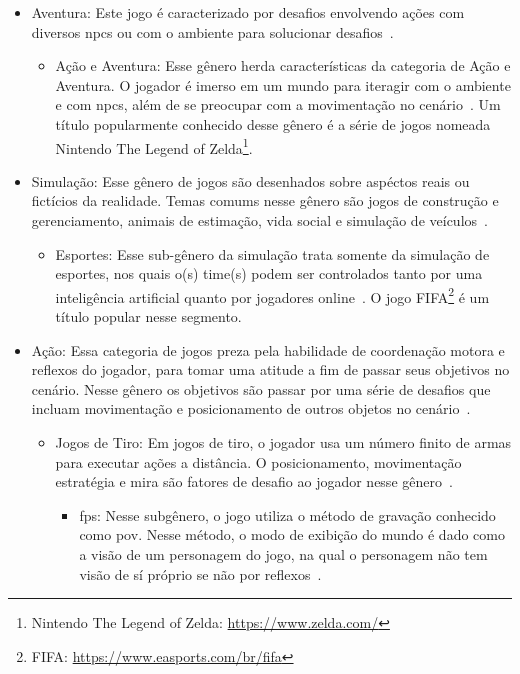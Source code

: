 \begin{itemize}
\begin{itemize}
    \end{itemize}
  \item Aventura: Este jogo é caracterizado por desafios envolvendo ações com diversos \ac{npcs} ou com o ambiente para solucionar desafios~\cite{adams_1208533}.
    \begin{itemize}
      \item Ação e Aventura: Esse gênero herda características da categoria de Ação e Aventura. O jogador é imerso em um mundo para iteragir com o ambiente e com \ac{npcs}, além de se preocupar com a movimentação no cenário~\cite{adams_1208533}. Um título popularmente conhecido desse gênero é a série de jogos nomeada Nintendo The Legend of Zelda\footnote{Nintendo The Legend of Zelda: \url{https://www.zelda.com/}}.
    \end{itemize}
  \item Simulação: Esse gênero de jogos são desenhados sobre aspéctos reais ou fictícios da realidade. Temas comums nesse gênero são jogos de construção e gerenciamento, animais de estimação, vida social e simulação de veículos~\cite{adams_1208533}.
    \begin{itemize}
      \item Esportes: Esse sub-gênero da simulação trata somente da simulação de esportes, nos quais o(s) time(s) podem ser controlados tanto por uma inteligência artificial quanto por jogadores online~\cite{adams_1208533}. O jogo FIFA\footnote{FIFA: \url{https://www.easports.com/br/fifa}} é um título popular nesse segmento.
    \end{itemize}
  \item Ação: Essa categoria de jogos preza pela habilidade de coordenação motora e reflexos do jogador, para tomar uma atitude a fim de passar seus objetivos no cenário. Nesse gênero os objetivos são passar por uma série de desafios que incluam movimentação e posicionamento de outros objetos no cenário~\cite{adams_1208533}.
    \begin{itemize}
      \item Jogos de Tiro: Em jogos de tiro, o jogador usa um número finito de armas para executar ações a distância. O posicionamento, movimentação estratégia e mira são fatores de desafio ao jogador nesse gênero~\cite{adams_1208533}.
        \begin{itemize}
          \item \ac{fps}: Nesse subgênero, o jogo utiliza o método de gravação conhecido como \ac{pov}. Nesse método, o modo de exibição do mundo é dado como a visão de um personagem do jogo, na qual o personagem não tem visão de sí próprio se não por reflexos~\cite{video_game_technologies, adams_1208533}.

\end{itemize}
\end{itemize}
\end{itemize}
